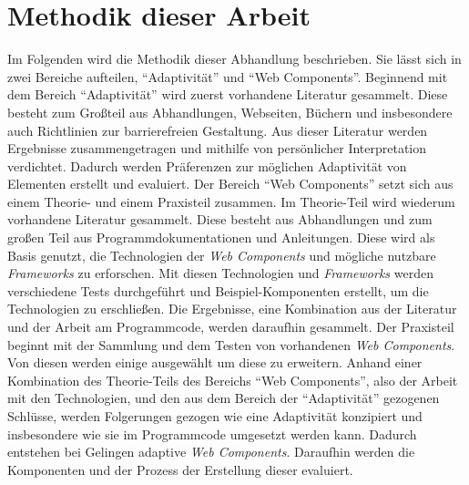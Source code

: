 \documentclass[12pt, paper=a4, bibtotoc, toc=listof, headsepline=true, numbers=endperiod]{scrreprt}
\begin{document}
\chapter{Methodik dieser Arbeit}
Im Folgenden wird die Methodik dieser Abhandlung beschrieben. Sie lässt sich in zwei Bereiche aufteilen, \enquote{Adaptivität} und \enquote{Web Components}.
Beginnend mit dem Bereich \enquote{Adaptivität} wird zuerst vorhandene Literatur gesammelt. Diese besteht zum Großteil aus Abhandlungen, Webseiten, Büchern und insbesondere auch Richtlinien zur barrierefreien Gestaltung. Aus dieser Literatur werden Ergebnisse zusammengetragen und mithilfe von persönlicher Interpretation verdichtet. Dadurch werden Präferenzen zur möglichen Adaptivität von Elementen erstellt und evaluiert.
\newline
Der Bereich \enquote{Web Components} setzt sich aus einem Theorie- und einem Praxisteil zusammen. Im Theorie-Teil wird wiederum vorhandene Literatur gesammelt. Diese besteht aus Abhandlungen und zum großen Teil aus Programmdokumentationen und Anleitungen. Diese wird als Basis genutzt, die Technologien der \emph{Web Components} und mögliche nutzbare \emph{Frameworks} zu erforschen. Mit diesen Technologien und \emph{Frameworks} werden verschiedene Tests durchgeführt und Beispiel-Komponenten erstellt, um die Technologien zu erschließen. Die Ergebnisse, eine Kombination aus der Literatur und der Arbeit am Programmcode, werden daraufhin gesammelt. Der Praxisteil beginnt mit der Sammlung und dem Testen von vorhandenen \emph{Web Components}. Von diesen werden einige ausgewählt um diese zu erweitern. Anhand einer Kombination des Theorie-Teils des Bereichs \enquote{Web Components}, also der Arbeit mit den Technologien, und den aus dem Bereich der \enquote{Adaptivität} gezogenen Schlüsse, werden Folgerungen gezogen wie eine Adaptivität konzipiert und insbesondere wie sie im Programmcode umgesetzt werden kann. Dadurch entstehen bei Gelingen adaptive \emph{Web Components}. Daraufhin werden die Komponenten und der Prozess der Erstellung dieser evaluiert.
\end{document}
